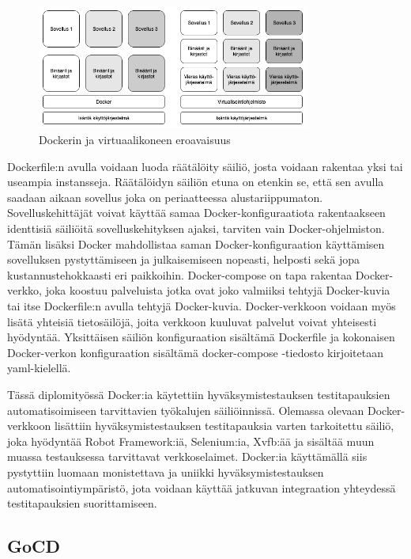     \begin{figure}[H]
      \centering
      \includegraphics[width=0.8\textwidth]{assets/docker-vs-virtual-machine.png}
      \caption{Dockerin ja virtuaalikoneen eroavaisuus}
      \label{fig:docker-vs-virtual-machine}
    \end{figure}

    Dockerfile:n avulla voidaan luoda räätälöity säiliö, josta voidaan rakentaa yksi tai useampia instansseja.
    Räätälöidyn säiliön etuna on etenkin se, että sen avulla saadaan aikaan sovellus joka on periaatteessa alustariippumaton.
    Sovelluskehittäjät voivat käyttää samaa Docker-konfiguraatiota rakentaakseen identtisiä säiliöitä sovelluskehityksen ajaksi, tarviten vain Docker-ohjelmiston.
    Tämän lisäksi Docker mahdollistaa saman Docker-konfiguraation käyttämisen sovelluksen pystyttämiseen ja julkaisemiseen nopeasti, helposti sekä jopa kustannustehokkaasti eri paikkoihin.
    Docker-compose on tapa rakentaa Docker-verkko, joka koostuu palveluista jotka ovat joko valmiiksi tehtyjä Docker-kuvia tai itse Dockerfile:n avulla tehtyjä Docker-kuvia.
    Docker-verkkoon voidaan myös lisätä yhteisiä tietosäilöjä, joita verkkoon kuuluvat palvelut voivat yhteisesti hyödyntää.
    Yksittäisen säiliön konfiguraation sisältämä Dockerfile ja kokonaisen Docker-verkon konfiguraation sisältämä docker-compose -tiedosto kirjoitetaan yaml-kielellä.

    Tässä diplomityössä Docker:ia käytettiin hyväksymistestauksen testitapauksien automatisoimiseen tarvittavien työkalujen säiliöinnissä.
    Olemassa olevaan Docker-verkkoon lisättiin hyväksymistestauksen testitapauksia varten tarkoitettu säiliö, joka hyödyntää Robot Framework:iä, Selenium:ia, Xvfb:ää ja sisältää muun muassa testauksessa tarvittavat verkkoselaimet.
    Docker:ia käyttämällä siis pystyttiin luomaan monistettava ja uniikki hyväksymistestauksen automatisointiympäristö, jota voidaan käyttää jatkuvan integraation yhteydessä testitapauksien suorittamiseen.

  \subsection{GoCD} \label{ch:08_gocd}

